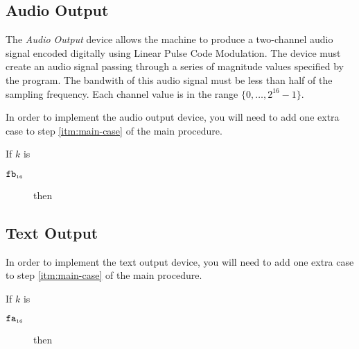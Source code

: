 \documentclass[a4paper,12pt]{article}
\newcommand{\num}[1]{\texttt{\MakeLowercase{#1}}}
\newcommand{\hex}[1]{\num{#1}_{\textup{\tiny 16}}}
\newcommand{\range}[2]{\{#1,\ldots,#2\}}
\newcommand{\proc}[1]{\textsc{#1}}
\newcommand{\deviceio}[1]{$\langle$#1$\rangle$}
\newcommand{\op}[1]{$#1$}
\theoremstyle{definition}
\newcommand{\PUTCHAR}   [1]{\op{\hex{FA}}}
\newcommand{\ADDSAMPLE} [1]{\op{\hex{FB}}}
\begin{document}
\subsection{Audio Output}

The \emph{Audio Output} device allows the machine to produce a two-channel audio signal encoded digitally using Linear Pulse Code Modulation.
The device must create an audio signal passing through a series of magnitude values specified by the program.
The bandwith of this audio signal must be less than half of the sampling frequency.
Each channel value is in the range $\range{0}{2^{16}-1}$.

In order to implement the audio output device, you will need to add one extra case to step \ref{itm:main-case} of the main procedure.

\begin{stepnumbers}[start=3]
\item If $k$ is
  \begin{description}
  \item[\ADDSAMPLE{}] then
  \end{description}
\end{stepnumbers}

\subsection{Text Output}

In order to implement the text output device, you will need to add one extra case to step \ref{itm:main-case} of the main procedure.

\begin{stepnumbers}[start=3]
  \setcounter{enumi}{2}
\item If $k$ is
  \begin{description}
  \item[\PUTCHAR{}] then
  \end{description}
\end{stepnumbers}
\end{document}
